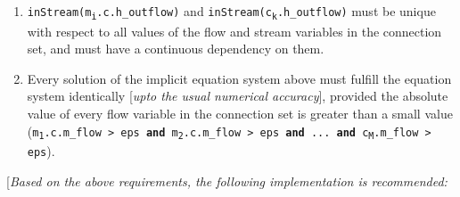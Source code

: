 \begin{enumerate}
\item
  \texttt{inStream(m\textsubscript{i}.c.h\_outflow)} and
  \texttt{inStream(c\textsubscript{k}.h\_outflow)} must be unique with
  respect to all values of the flow and stream variables in the
  connection set, and must have a continuous dependency on them.
\item
  Every solution of the implicit equation system above must fulfill the
  equation system identically {[}\emph{upto the usual numerical
  accuracy}{]}, provided the absolute value of every flow variable in
  the connection set is greater than a small value
  (\texttt{\textbar{}m\textsubscript{1}.c.m\_flow\textbar{} \textgreater{} eps
  \textbf{and} \textbar{}m\textsubscript{2}.c.m\_flow\textbar{}
  \textgreater{} eps \textbf{and} ... \textbf{and}
  \textbar{}c\textsubscript{M}.m\_flow\textbar{} \textgreater{} eps}).
\end{enumerate}

{[}\emph{Based on the above requirements, the following implementation
is recommended:}

